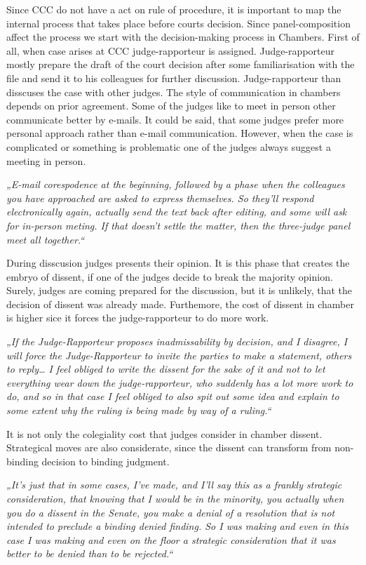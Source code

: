 \documentclass[
  11pt,
]{article}
\begin{document}
Since CCC do not have a act on rule of procedure, it is important to map
the internal process that takes place before courts decision. Since
panel-composition affect the process we start with the decision-making
process in Chambers. First of all, when case arises at CCC
judge-rapporteur is assigned. Judge-rapporteur mostly prepare the draft
of the court decision after some familiarisation with the file and send
it to his colleagues for further discussion. Judge-rapporteur than
disscuses the case with other judges. The style of communication in
chambers depends on prior agreement. Some of the judges like to meet in
person other communicate better by e-mails. It could be said, that some
judges prefer more personal approach rather than e-mail communication.
However, when the case is complicated or something is problematic one of
the judges always suggest a meeting in person.

\emph{„E-mail corespodence at the beginning, followed by a phase when
the colleagues you have approached are asked to express themselves. So
they'll respond electronically again, actually send the text back after
editing, and some will ask for in-person meting. If that doesn't settle
the matter, then the three-judge panel meet all together.``}

During disscusion judges presents their opinion. It is this phase that
creates the embryo of dissent, if one of the judges decide to break the
majority opinion. Surely, judges are coming prepared for the discussion,
but it is unlikely, that the decision of dissent was already made.
Furthemore, the cost of dissent in chamber is higher sice it forces the
judge-rapporteur to do more work.

\emph{„If the Judge-Rapporteur proposes inadmissability by decision, and
I disagree, I will force the Judge-Rapporteur to invite the parties to
make a statement, others to reply\ldots{} I feel obliged to write the
dissent for the sake of it and not to let everything wear down the
judge-rapporteur, who suddenly has a lot more work to do, and so in that
case I feel obliged to also spit out some idea and explain to some
extent why the ruling is being made by way of a ruling.``}

It is not only the colegiality cost that judges consider in chamber
dissent. Strategical moves are also considerate, since the dissent can
transform from non-binding decision to binding judgment.

\emph{„It's just that in some cases, I've made, and I'll say this as a
frankly strategic consideration, that knowing that I would be in the
minority, you actually when you do a dissent in the Senate, you make a
denial of a resolution that is not intended to preclude a binding denied
finding. So I was making and even in this case I was making and even on
the floor a strategic consideration that it was better to be denied than
to be rejected.``}
\end{document}
